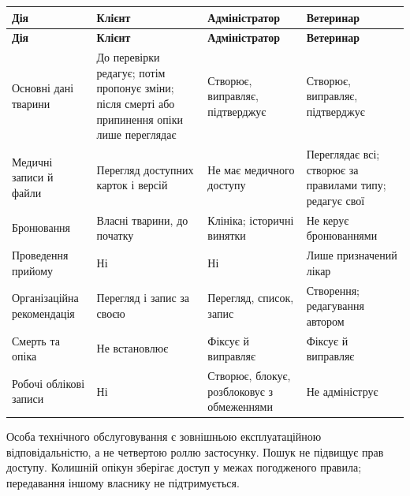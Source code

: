 \documentclass[11pt,a4paper]{article}
\begin{document}
\begin{longtable}{>{\raggedright\arraybackslash}p{3cm} >{\raggedright\arraybackslash}p{4.1cm} >{\raggedright\arraybackslash}p{4.1cm} >{\raggedright\arraybackslash}p{4.1cm}}
\toprule
\textbf{Дія} & \textbf{Клієнт} & \textbf{Адміністратор} & \textbf{Ветеринар} \\ \midrule
\endfirsthead
\toprule
\textbf{Дія} & \textbf{Клієнт} & \textbf{Адміністратор} & \textbf{Ветеринар} \\ \midrule
\endhead
\bottomrule
\endfoot
Основні дані тварини & До перевірки редагує; потім пропонує зміни; після смерті або припинення опіки лише переглядає & Створює, виправляє, підтверджує & Створює, виправляє, підтверджує \\
Медичні записи й файли & Перегляд доступних карток і версій & Не має медичного доступу & Переглядає всі; створює за правилами типу; редагує свої \\
Бронювання & Власні тварини, до початку & Клініка; історичні винятки & Не керує бронюваннями \\
Проведення прийому & Ні & Ні & Лише призначений лікар \\
Організаційна рекомендація & Перегляд і запис за своєю & Перегляд, список, запис & Створення; редагування автором \\
Смерть та опіка & Не встановлює & Фіксує й виправляє & Фіксує й виправляє \\
Робочі облікові записи & Ні & Створює, блокує, розблоковує з обмеженнями & Не адмініструє \\
\end{longtable}

Особа технічного обслуговування є зовнішньою експлуатаційною відповідальністю, а не четвертою роллю застосунку. Пошук не підвищує прав доступу. Колишній опікун зберігає доступ у межах погодженого правила; передавання іншому власнику не підтримується.
\end{document}
